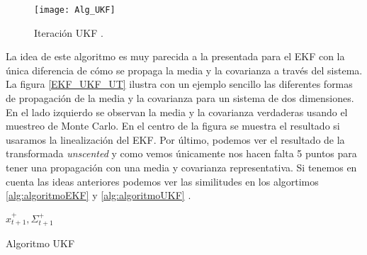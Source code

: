 \begin{figure}[ht!]
\centering
\texttt{[image: Alg\_UKF]}
\caption{Iteración UKF \cite{_leyton_2009} \cite{luigi_d&39;alfonso_mobile_2015} .} \label{Iteracion_UKF}
\end{figure}
La idea de este algoritmo es muy parecida a la presentada para el \ac{EKF} con la única diferencia de cómo se propaga la media y la covarianza a través del sistema.
La figura \ref{EKF_UKF_UT} ilustra con un ejemplo sencillo las diferentes formas de propagación de la media y la covarianza para un sistema de dos dimensiones.
En el lado izquierdo se observan la media y la covarianza verdaderas usando el muestreo de Monte Carlo.
En el centro de la figura se muestra el resultado si usaramos la linealización del \ac{EKF}.
Por último, podemos ver el resultado de la transformada \textit{unscented} y como vemos únicamente nos hacen falta 5 puntos para tener una propagación con una media y covarianza representativa.
Si tenemos en cuenta las ideas anteriores podemos ver las similitudes en los algortimos \ref{alg:algoritmoEKF} y \ref{alg:algoritmoUKF} \cite{zhou_ukf_2007}.
\begin{algorithm}
\begin{algorithmic} 
\RETURN $\hat{x}_{t+1}^{+},\Sigma_{t+1}^{+}$
\end{algorithmic}
\caption{Algoritmo UKF \cite{_leyton_2009} \cite{luigi_d&39;alfonso_mobile_2015}}\label{alg:algoritmoUKF}
\end{algorithm}

